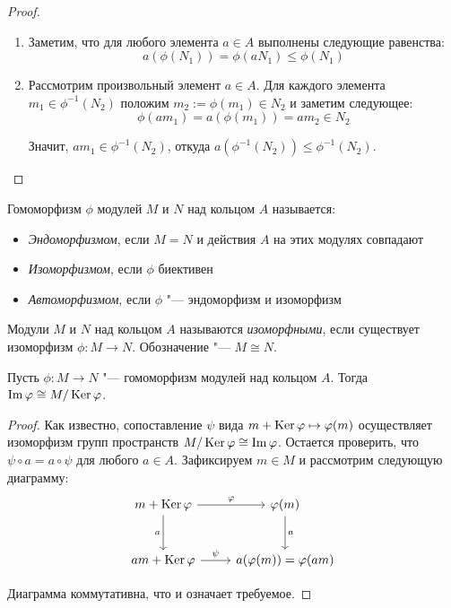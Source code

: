 \begin{proof}~
	\begin{enumerate}
		\item Заметим, что для любого элемента $a \in A$ выполнены следующие равенства:
		\[a(\phi(N_1)) = \phi(aN_1) \le \phi(N_1)\]
		\item Рассмотрим произвольный элемент $a \in A$. Для каждого элемента $m_1 \in \phi^{-1}(N_2)$ положим $m_2 := \phi(m_1) \in N_2$ и заметим следующее:
		\[\phi(am_1) = a(\phi(m_1)) = am_2 \in N_2\]
		
		Значит, $am_1 \in \phi^{-1}(N_2)$, откуда $a(\phi^{-1}(N_2)) \le \phi^{-1}(N_2)$.\qedhere
	\end{enumerate}
\end{proof}

\begin{definition}
	Гомоморфизм $\phi$ модулей $M$ и $N$ над кольцом $A$ называется:
	\begin{itemize}
		\item \textit{Эндоморфизмом}, если $M = N$ и действия $A$ на этих модулях совпадают
		\item \textit{Изоморфизмом}, если $\phi$ биективен
		\item \textit{Автоморфизмом}, если $\phi$ "--- эндоморфизм и изоморфизм
	\end{itemize}
\end{definition}

\begin{definition}
	Модули $M$ и $N$ над кольцом $A$ называются \textit{изоморфными}, если существует изоморфизм $\phi : M \to N$. Обозначение "--- $M \cong N$.
\end{definition}

\begin{theorem}
	Пусть $\phi: M \to N$ "--- гомоморфизм модулей над кольцом $A$. Тогда $\operatorname{Im}\varphi \cong M / \operatorname{Ker}\varphi$.
\end{theorem}

\begin{proof}
	Как известно, сопоставление $\psi$ вида $m + \operatorname{Ker}\varphi \mapsto \varphi(m)$ осуществляет изоморфизм групп пространств $M / \operatorname{Ker}\varphi \cong \operatorname{Im}\varphi$. Остается проверить, что $\psi \circ a = a \circ \psi$ для любого $a \in A$. Зафиксируем $m \in M$ и рассмотрим следующую диаграмму:
	\[
	\begin{tikzcd}[row sep = large]
		m + \ke\phi \arrow[swap]{d}{a} \arrow{r}{\phi} & \phi(m) \arrow{d}{a}\\
		am + \ke\phi \arrow{r}{\psi} & a(\phi(m)) = \phi(am)
	\end{tikzcd}
	\]
	
	Диаграмма коммутативна, что и означает требуемое.
\end{proof}

